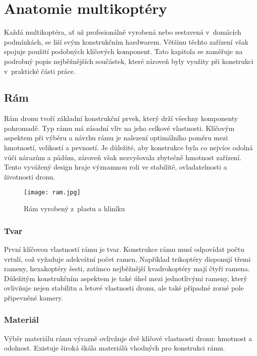 \documentclass[12pt]{report}
\begin{document}
\chapter[Anatomie multikoptéry]{Anatomie multikoptéry}
Každá multikoptéra, ať už profesionálně vyrobená nebo sestavená v~domácích podmínkách, se liší svým konstrukčním hardwarem. Většinu těchto zařízení však spojuje použití podobných klíčových komponent. Tato kapitola se zaměřuje na podrobný popis nejběžnějších součástek, které zároveň byly využity při konstrukci v~praktické části práce.

\section[Rám]{Rám}
Rám dronu tvoří základní konstrukční prvek, který drží všechny komponenty pohromadě. Typ rámu  má zásadní vliv na jeho celkové vlastnosti. Klíčovým aspektem při výběru a návrhu rámu je nalezení optimálního poměru mezi hmotností, velikostí a pevností. Je důležité, aby konstrukce byla co nejvíce odolná vůči nárazům a pádům, zároveň však nezvyšovala zbytečně hmotnost zařízení. Tento vyvážený design hraje významnou roli ve stabilitě, ovladatelnosti a životnosti dronu.

\begin{figure}[H]
	\centering
	\texttt{[image: ram.jpg]}
	\caption{Rám vyrobený z~plastu a hliníku \cite{mainbook}}
	\label{fig:ram.jpg}
  \end{figure}

\subsection[Tvar]{Tvar}
První klíčovou vlastností rámu je tvar. Konstrukce rámu musí odpovídat počtu vrtulí, což vyžaduje adekvátní počet ramen. Například trikoptéry disponují třemi rameny, hexakoptéry šesti, zatímco nejběžnější kvadrokoptéry mají čtyři ramena. Důležitým konstrukčním aspektem je také úhel mezi jednotlivými rameny, který ovlivňuje nejen stabilitu a letové vlastnosti dronu, ale také případné zorné pole připevněné kamery.

\subsection[Materiál]{Materiál}
Výběr materiálu rámu výrazně ovlivňuje dvě klíčové vlastnosti dronu: hmotnost a odolnost. Existuje široká škála materiálů vhodných pro konstrukci rámu.
\end{document}
